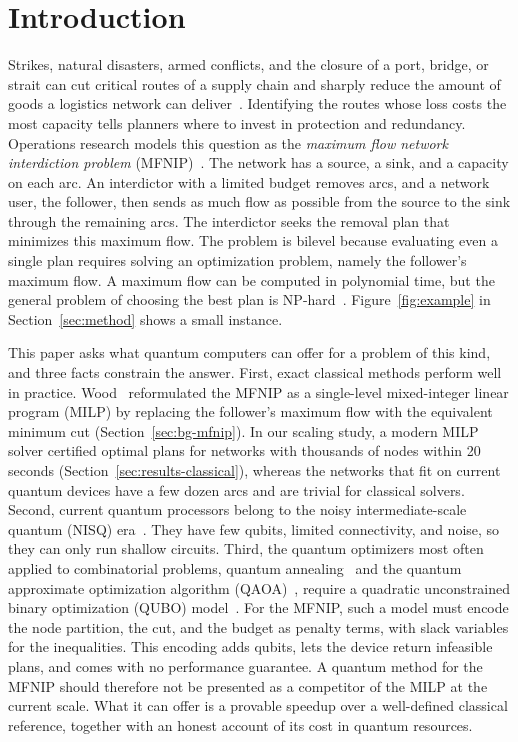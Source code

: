 \section{Introduction}\label{sec:intro}

Strikes, natural disasters, armed conflicts, and the closure of a port, bridge, or strait can cut critical routes of a supply chain and sharply reduce the amount of goods a logistics network can deliver~\cite{supplychain_resilience}. Identifying the routes whose loss costs the most capacity tells planners where to invest in protection and redundancy. Operations research models this question as the \emph{maximum flow network interdiction problem} (MFNIP)~\cite{wood1993,smith2020}. The network has a source, a sink, and a capacity on each arc. An interdictor with a limited budget removes arcs, and a network user, the follower, then sends as much flow as possible from the source to the sink through the remaining arcs. The interdictor seeks the removal plan that minimizes this maximum flow. The problem is bilevel because evaluating even a single plan requires solving an optimization problem, namely the follower's maximum flow. A maximum flow can be computed in polynomial time, but the general problem of choosing the best plan is NP-hard~\cite{wood1993}. Figure~\ref{fig:example} in Section~\ref{sec:method} shows a small instance.

This paper asks what quantum computers can offer for a problem of this kind, and three facts constrain the answer. First, exact classical methods perform well in practice. Wood~\cite{wood1993} reformulated the MFNIP as a single-level mixed-integer linear program (MILP) by replacing the follower's maximum flow with the equivalent minimum cut (Section~\ref{sec:bg-mfnip}). In our scaling study, a modern MILP solver certified optimal plans for networks with thousands of nodes within 20 seconds (Section~\ref{sec:results-classical}), whereas the networks that fit on current quantum devices have a few dozen arcs and are trivial for classical solvers. Second, current quantum processors belong to the noisy intermediate-scale quantum (NISQ) era~\cite{preskill2018}. They have few qubits, limited connectivity, and noise, so they can only run shallow circuits. Third, the quantum optimizers most often applied to combinatorial problems, quantum annealing~\cite{kadowaki1998} and the quantum approximate optimization algorithm (QAOA)~\cite{farhi2014}, require a quadratic unconstrained binary optimization (QUBO) model~\cite{lucas2014,glover2019}. For the MFNIP, such a model must encode the node partition, the cut, and the budget as penalty terms, with slack variables for the inequalities. This encoding adds qubits, lets the device return infeasible plans, and comes with no performance guarantee. A quantum method for the MFNIP should therefore not be presented as a competitor of the MILP at the current scale. What it can offer is a provable speedup over a well-defined classical reference, together with an honest account of its cost in quantum resources.

